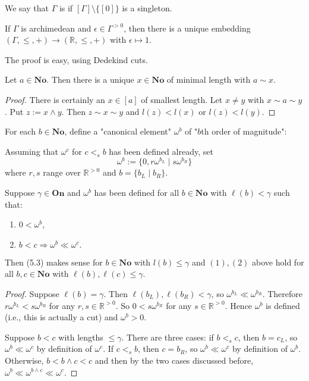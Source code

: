 We say that $\Gamma$ is  if $[\Gamma]\setminus \{[0]\}$ is a singleton.
\begin{lemma} %
If $\Gamma$ is archimedean and $\epsilon\in \Gamma^{>0}$, then there is a unique embedding $(\Gamma,\le,+)\rightarrow (\mathbb{R},\le,+)$ with $\epsilon\mapsto 1$.
 \end{lemma}

The proof is easy, using Dedekind cuts.

\begin{lemma} %
Let $a\in \mathbf{No}$. Then there is a unique $x\in \mathbf{No}$ of minimal length with $a\sim x$.
 \end{lemma}

\begin{proof} %
There is certainly an $x\in [a]$ of smallest length. Let $x\neq y$ with $x\sim a\sim y$. Put $z:=x\wedge y$. Then $z\sim x\sim y$ and $l(z)<l(x)$ or $l(z)<l(y)$.
 \end{proof}


For each $b\in\mathbf{No}$, define a "canonical element" $\omega^b$ of "$b$th order of magnitude":

\begin{definition} %
Assuming that $\omega^c$ for $c<_s b$ has been defined already, set 
$$\omega^b:=\{0,r\omega^{b_L}\mid s\omega^{b_R}\}$$
where $r,s$ range over $\mathbb{R}^{>0}$ and $b=\{b_L\mid b_R\}$.
 \end{definition}


\begin{lemma} %
Suppose $\gamma\in \mathbf{On}$ and $\omega^b$ has been defined for all $b\in \mathbf{No}$ with $\ell(b)<\gamma$ such that:
\begin{enumerate}
  \item  $0<\omega^b$,
  \item  $b<c \Rightarrow \omega^b\ll \omega^c.$
\end{enumerate}
Then (5.3) makes sense for $b\in \mathbf{No}$ with $l(b)\le \gamma$ and $(1),(2)$ above hold for all $b,c\in\mathbf{No}$ with $\ell(b),\ell(c)\le \gamma$. 
\end{lemma}

\begin{proof} %
Suppose $\ell(b)=\gamma$. Then $\ell(b_L),\ell(b_R)<\gamma$, so $\omega^{b_L} \ll \omega^{b_R}$. Therefore $r\omega^{b_L}<s\omega^{b_R}$ for any $r,s\in \mathbb{R}^{>0}$. So $0<s\omega^{b_R}$ for any $s\in \mathbb{R}^{>0}$. Hence $\omega^b$ is defined (i.e., this is actually a cut) and $\omega^b>0$.

Suppose $b<c$ with lengths $\le \gamma$. There are three cases: if $b<_s c$, then $b=c_L$, so $\omega^b\ll\omega^c$ by definition of $\omega^c$. If $c<_s b$, then $c=b_R$, so $\omega^b\ll\omega^c$ by definition of $\omega^b$. Otherwise, $b<b\wedge c<c$ and then by the two cases discussed before,
$\omega^b\ll\omega^{b\wedge c}\ll\omega^c$.
 \end{proof}


